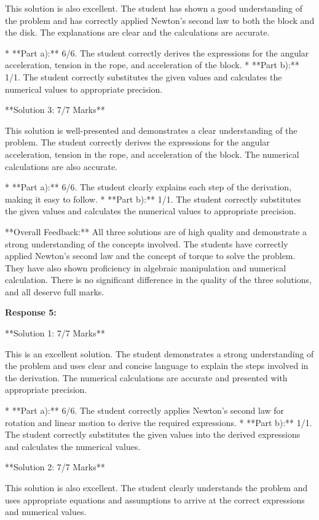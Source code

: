 \documentclass[a4paper,11pt]{article}
\begin{document}
This solution is also excellent. The student has shown a good understanding of the problem and has correctly applied Newton's second law to both the block and the disk. The explanations are clear and the calculations are accurate.

*   **Part a):** 6/6. The student correctly derives the expressions for the angular acceleration, tension in the rope, and acceleration of the block.
*   **Part b):** 1/1. The student correctly substitutes the given values and calculates the numerical values to appropriate precision.

**Solution 3: 7/7 Marks**

This solution is well-presented and demonstrates a clear understanding of the problem. The student correctly derives the expressions for the angular acceleration, tension in the rope, and acceleration of the block. The numerical calculations are also accurate.

*   **Part a):** 6/6. The student clearly explains each step of the derivation, making it easy to follow.
*   **Part b):** 1/1. The student correctly substitutes the given values and calculates the numerical values to appropriate precision.

**Overall Feedback:**
All three solutions are of high quality and demonstrate a strong understanding of the concepts involved. The students have correctly applied Newton's second law and the concept of torque to solve the problem. They have also shown proficiency in algebraic manipulation and numerical calculation. There is no significant difference in the quality of the three solutions, and all deserve full marks.

\textbf{Response 5:}

**Solution 1: 7/7 Marks**

This is an excellent solution. The student demonstrates a strong understanding of the problem and uses clear and concise language to explain the steps involved in the derivation. The numerical calculations are accurate and presented with appropriate precision.

*   **Part a):** 6/6. The student correctly applies Newton's second law for rotation and linear motion to derive the required expressions.
*   **Part b):** 1/1. The student correctly substitutes the given values into the derived expressions and calculates the numerical values.

**Solution 2: 7/7 Marks**

This solution is also excellent. The student clearly understands the problem and uses appropriate equations and assumptions to arrive at the correct expressions and numerical values.
\end{document}
